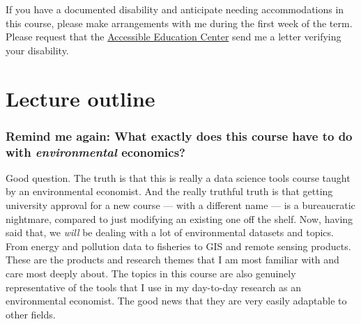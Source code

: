 \documentclass[12]{article}
\begin{document}
If you have a documented disability and anticipate needing accommodations in this course, please make arrangements with me during the first week of the term. Please request that the \href{https://aec.uoregon.edu/}{Accessible Education Center} send me a letter verifying your disability.

\newpage
\section*{Lecture outline}
\label{sec:outline}



\vspace{-0.25cm}
\subsubsection*{Remind me again: What exactly does this course have to do with \textit{environmental} economics?}
Good question. The truth is that this is really a data science tools course taught by an environmental economist. And the really truthful truth is that getting university approval for a new course --- with a different name --- is a bureaucratic nightmare, compared to just modifying an existing one off the shelf. Now, having said that, we \textit{will} be dealing with a lot of environmental datasets and topics. From energy and pollution data to fisheries to GIS and remote sensing products. These are the products and research themes that I am most familiar with and care most deeply about. The topics in this course are also genuinely representative of the tools that I use in my day-to-day research as an environmental economist. The good news that they are very easily adaptable to other fields.
\end{document}
